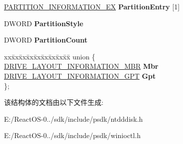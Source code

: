 \begin{DoxyCompactItemize}
\begin{tabbing}
\end{tabbing}\item 
\mbox{\label{struct___d_r_i_v_e___l_a_y_o_u_t___i_n_f_o_r_m_a_t_i_o_n___e_x_a766822115f281107a1b29e7c166a2534}} 
\hyperlink{struct___p_a_r_t_i_t_i_o_n___i_n_f_o_r_m_a_t_i_o_n___e_x}{P\+A\+R\+T\+I\+T\+I\+O\+N\+\_\+\+I\+N\+F\+O\+R\+M\+A\+T\+I\+O\+N\+\_\+\+EX} {\bfseries Partition\+Entry} \mbox{[}1\mbox{]}
\item 
\mbox{\label{struct___d_r_i_v_e___l_a_y_o_u_t___i_n_f_o_r_m_a_t_i_o_n___e_x_adfda664df97a77a5ef60dcbf800cf321}} 
D\+W\+O\+RD {\bfseries Partition\+Style}
\item 
\mbox{\label{struct___d_r_i_v_e___l_a_y_o_u_t___i_n_f_o_r_m_a_t_i_o_n___e_x_acaf47e14e16fbfa14f61a1fc0062ba7d}} 
D\+W\+O\+RD {\bfseries Partition\+Count}
\item 
\mbox{\label{struct___d_r_i_v_e___l_a_y_o_u_t___i_n_f_o_r_m_a_t_i_o_n___e_x_a4b4c90d01ca69230a2821790ee0f86fb}} 
\begin{tabbing}
xx\=xx\=xx\=xx\=xx\=xx\=xx\=xx\=xx\=\kill
union \{\\
\>\hyperlink{struct___d_r_i_v_e___l_a_y_o_u_t___i_n_f_o_r_m_a_t_i_o_n___m_b_r}{DRIVE\_LAYOUT\_INFORMATION\_MBR} {\bfseries Mbr}\\
\>\hyperlink{struct___d_r_i_v_e___l_a_y_o_u_t___i_n_f_o_r_m_a_t_i_o_n___g_p_t}{DRIVE\_LAYOUT\_INFORMATION\_GPT} {\bfseries Gpt}\\
\}; \\

\end{tabbing}\end{DoxyCompactItemize}


该结构体的文档由以下文件生成\+:\begin{DoxyCompactItemize}
\item 
E\+:/\+React\+O\+S-\/0../sdk/include/psdk/ntdddisk.\+h\item 
E\+:/\+React\+O\+S-\/0../sdk/include/psdk/winioctl.\+h\end{DoxyCompactItemize}
